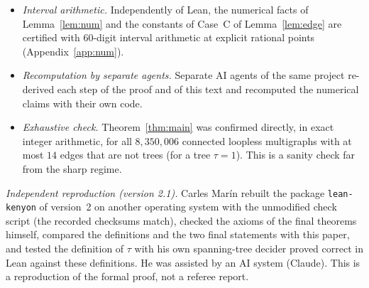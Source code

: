 \documentclass[11pt]{amsart}
\theoremstyle{plain}
\theoremstyle{remark}
\newcommand{\code}[1]{\texttt{#1}}
\newcommand{\rb}{\bar r}
\begin{document}
\begin{itemize}
  \ref{sec:edge} are formalised as statements about real numbers. Lean checks the following: let $h$ be a positive
  function on the darts of a finite multigraph with minimum degree at least $2$ and no edge between two vertices of
  degree $2$; if $h$ satisfies the first-step equation \eqref{eq:h} and is the pointwise limit of functions
  $h^{(t)}$ with $h^{(0)}=0$ that satisfy the inequality stated after \eqref{eq:h}, then
  $\sum_v\log\bigl(d_v-\sum_{u\sim v}h_{u\to v}\bigr)-\sum_e\log(1-q_e)\le m\cdot\frac12\log\frac{27}{8}$; the left
  side equals $\sum_e\log(1+r_e)-\sum_v\log x_v$. This covers the bounds of Lemma~\ref{lem:apriori}, the
  identities \eqref{eq:I}, the bounds on $\rb_v$ in Lemma~\ref{lem:ranges}, Lemma~\ref{lem:onevar} and the
  inequality $E_e\le L$ of Lemma~\ref{lem:edge}. In place of the decimal values of Lemma~\ref{lem:num} and of
  Case~C, Lean uses exact inequalities between natural numbers for degrees $2$ to $119$, evaluated by its kernel,
  and a direct estimate for larger degrees. The proof contains no \code{sorry} and uses only the three standard
  axioms of Lean and Mathlib, and an explicit example shows that equality can occur.
  This package is kept unchanged from version~1; its eight modules are used, without change, by the formal
  proof of Theorem~\ref{thm:main}. In version~1 this was the only formalised part, and
  Theorem~\ref{thm:main} itself was not machine-checked.
\item \emph{Interval arithmetic.} Independently of Lean, the numerical facts of Lemma~\ref{lem:num} and the
  constants of Case~C of Lemma~\ref{lem:edge} are certified with $60$-digit interval arithmetic at explicit rational
  points (Appendix~\ref{app:num}).
\item \emph{Recomputation by separate agents.} Separate AI agents of the same project re-derived each step of the
  proof and of this text and recomputed the numerical claims with their own code.
\item \emph{Exhaustive check.} Theorem~\ref{thm:main} was confirmed directly, in exact integer arithmetic, for all
  $8{,}350{,}006$ connected loopless multigraphs with at most $14$ edges that are not trees (for a tree $\tau=1$).
  This is a sanity check far from the sharp regime.
\end{itemize}
\emph{Independent reproduction (version 2.1).} Carles Mar\'in rebuilt the package \code{lean-kenyon} of version~2
on another operating system with the unmodified check script (the recorded checksums match), checked the axioms of
the final theorems himself, compared the definitions and the two final statements with this paper, and tested the
definition of $\tau$ with his own spanning-tree decider proved correct in Lean against these definitions. He was
assisted by an AI system (Claude). This is a reproduction of the formal proof, not a referee report.
\end{document}
